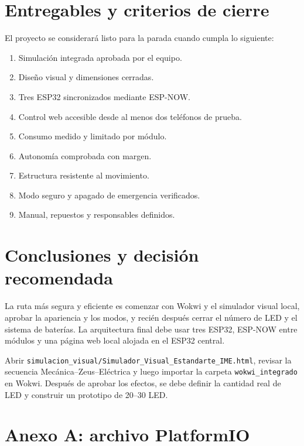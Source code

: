 \documentclass[11pt,a4paper]{article}
\begin{document}
\section{Entregables y criterios de cierre}
El proyecto se considerará listo para la parada cuando cumpla lo siguiente:
\begin{enumerate}
  \item Simulación integrada aprobada por el equipo.
  \item Diseño visual y dimensiones cerradas.
  \item Tres ESP32 sincronizados mediante ESP-NOW.
  \item Control web accesible desde al menos dos teléfonos de prueba.
  \item Consumo medido y limitado por módulo.
  \item Autonomía comprobada con margen.
  \item Estructura resistente al movimiento.
  \item Modo seguro y apagado de emergencia verificados.
  \item Manual, repuestos y responsables definidos.
\end{enumerate}

\section{Conclusiones y decisión recomendada}
La ruta más segura y eficiente es comenzar con Wokwi y el simulador visual local, aprobar la apariencia y los modos, y recién después cerrar el número de LED y el sistema de baterías. La arquitectura final debe usar tres ESP32, ESP-NOW entre módulos y una página web local alojada en el ESP32 central.

\begin{successbox}
Abrir \texttt{simulacion\_visual/Simulador\_Visual\_Estandarte\_IME.html}, revisar la secuencia Mecánica--Zeus--Eléctrica y luego importar la carpeta \texttt{wokwi\_integrado} en Wokwi. Después de aprobar los efectos, se debe definir la cantidad real de LED y construir un prototipo de 20--30 LED.
\end{successbox}

\appendix
\section{Anexo A: archivo PlatformIO}

\end{document}
